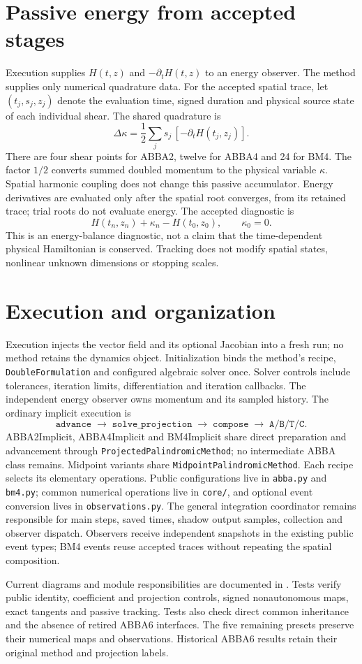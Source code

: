 \documentclass[11pt,a4paper]{article}
\begin{document}
\section{Passive energy from accepted stages}
Execution supplies $H(t,z)$ and $-\partial_tH(t,z)$ to an energy observer.
The method supplies only numerical quadrature data. For the accepted spatial
trace, let $(t_j,s_j,z_j)$ denote the evaluation time, signed duration and
physical source state of each individual shear. The shared quadrature is
\[
 \Delta\kappa=\frac12\sum_j s_j\,[-\partial_tH(t_j,z_j)].
\]
There are four shear points for ABBA2, twelve for ABBA4 and 24 for BM4. The factor $1/2$ converts summed doubled momentum to the
physical variable $\kappa$. Spatial harmonic coupling does not change this
passive accumulator. Energy derivatives are evaluated only after the spatial
root converges, from its retained trace; trial roots do not evaluate energy.
The accepted diagnostic is
\[
 H(t_n,z_n)+\kappa_n-H(t_0,z_0),\qquad \kappa_0=0.
\]
This is an energy-balance diagnostic, not a claim that the time-dependent
physical Hamiltonian is conserved. Tracking does not modify spatial states,
nonlinear unknown dimensions or stopping scales.

\section{Execution and organization}
Execution injects the vector field and its optional Jacobian into a fresh run;
no method retains the dynamics object. Initialization binds the method's recipe,
\texttt{DoubleFormulation} and configured algebraic solver once. Solver controls
include tolerances, iteration limits, differentiation and iteration callbacks.
The independent energy observer owns momentum and its sampled history. The
ordinary implicit execution is
\[
 \texttt{advance}\;\longrightarrow\;\texttt{solve\_projection}
 \;\longrightarrow\;\texttt{compose}
 \;\longrightarrow\;\texttt{A/B/T/C}.
\]
ABBA2Implicit, ABBA4Implicit and BM4Implicit share direct preparation and
advancement through \texttt{ProjectedPalindromicMethod}; no intermediate ABBA
class remains. Midpoint variants share \texttt{MidpointPalindromicMethod}.
Each recipe selects its elementary operations.
Public configurations live in \texttt{abba.py} and \texttt{bm4.py}; common
numerical operations live in \texttt{core/}, and optional event conversion
lives in \texttt{observations.py}. The general
integration coordinator remains responsible for main steps, saved times,
shadow output samples, collection and observer dispatch. Observers receive
independent snapshots in the existing public event types; BM4 events reuse
accepted traces without repeating the spatial composition.

Current diagrams and module responsibilities are documented in
.
Tests verify public identity, coefficient and projection controls, signed
nonautonomous maps, exact tangents and passive tracking. Tests also check
direct common inheritance and the absence of retired ABBA6 interfaces.
The five remaining presets preserve their numerical maps and observations.
Historical ABBA6 results retain their original method and projection labels.
\end{document}
